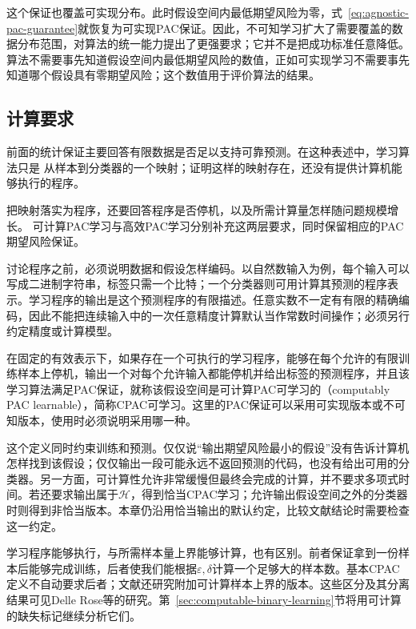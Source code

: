 这个保证也覆盖可实现分布。此时假设空间内最低期望风险为零，式~\eqref{eq:agnostic-pac-guarantee}就恢复为可实现PAC保证。因此，不可知学习扩大了需要覆盖的数据分布范围，对算法的统一能力提出了更强要求；它并不是把成功标准任意降低。算法不需要事先知道假设空间内最低期望风险的数值，正如可实现学习不需要事先知道哪个假设具有零期望风险；这个数值用于评价算法的结果。

\subsection{计算要求}
\label{sec:pac-computation-requirements}

前面的统计保证主要回答有限数据是否足以支持可靠预测。在这种表述中，学习算法只是
从样本到分类器的一个映射；证明这样的映射存在，还没有提供计算机能够执行的程序。

把映射落实为程序，还要回答程序是否停机，以及所需计算量怎样随问题规模增长。
可计算PAC学习与高效PAC学习分别补充这两层要求，同时保留相应的PAC期望风险保证。

讨论程序之前，必须说明数据和假设怎样编码。以自然数输入为例，每个输入可以写成二进制字符串，标签只需一个比特；一个分类器则可用计算其预测的程序表示。学习程序的输出是这个预测程序的有限描述。任意实数不一定有有限的精确编码，因此不能把连续输入中的一次任意精度计算默认当作常数时间操作；必须另行约定精度或计算模型。

\begin{definition}[可计算PAC学习]
\label{def:computable-pac-learning}
在固定的有效表示下，如果存在一个可执行的学习程序，能够在每个允许的有限训练样本上停机，输出一个对每个允许输入都能停机并给出标签的预测程序，并且该学习算法满足PAC保证，就称该假设空间是可计算PAC可学习的（computably PAC learnable），简称CPAC可学习。这里的PAC保证可以采用可实现版本或不可知版本，使用时必须说明采用哪一种。
\end{definition}

这个定义同时约束训练和预测。仅仅说“输出期望风险最小的假设”没有告诉计算机怎样找到该假设；仅仅输出一段可能永远不返回预测的代码，也没有给出可用的分类器。另一方面，可计算性允许非常缓慢但最终会完成的计算，并不要求多项式时间。若还要求输出属于$\mathcal H$，得到恰当CPAC学习；允许输出假设空间之外的分类器时则得到非恰当版本。本章仍沿用恰当输出的默认约定，比较文献结论时需要检查这一约定。

学习程序能够执行，与所需样本量上界能够计算，也有区别。前者保证拿到一份样本后能够完成训练，后者使我们能根据$\varepsilon,\delta$计算一个足够大的样本数。基本CPAC定义不自动要求后者；文献还研究附加可计算样本上界的版本。这些区分及其分离结果可见Delle Rose等的研究。第~\ref{sec:computable-binary-learning}节将用可计算的缺失标记继续分析它们。

